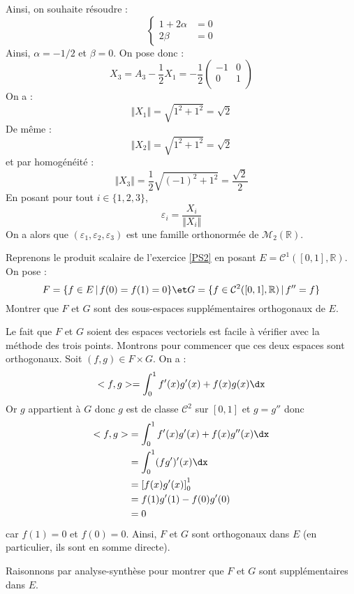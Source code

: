 \documentclass[a4paper,10pt]{report}
\begin{document}
Ainsi, on souhaite résoudre :
$$ \left\lbrace \begin{array}{rl}
1+ 2 \alpha & = 0 \\
2 \beta & = 0 
\end{array}\right.$$
Ainsi, $\alpha=-1/2$ et $\beta=0$.
On pose donc :
$$ X_3 = A_3 - \dfrac{1}{2} X_1 = -\dfrac{1}{2} \begin{pmatrix}
-1 & 0 \\
0 & 1 \\
\end{pmatrix}$$
On a :
$$ \Vert X_1 \Vert = \sqrt{1^2+1^2} = \sqrt{2}$$
De même :
$$ \Vert X_2 \Vert = \sqrt{1^2+1^2} = \sqrt{2}$$
et par homogénéité :
$$ \Vert X_3 \Vert = \dfrac{1}{2} \sqrt{(-1)^2+1^2} = \dfrac{\sqrt{2}}{2}$$
En posant pour tout $i \in \lbrace 1,2,3 \rbrace$,
$$ \varepsilon_i = \dfrac{X_i}{\Vert X_i \Vert}$$
On a alors que $(\varepsilon_1, \varepsilon_2, \varepsilon_3)$ est une famille orthonormée de $\mathcal{M}_2(\mathbb{R})$.

\begin{Exa} Reprenons le produit scalaire de l'exercice \ref{PS2} en posant $E= \mathcal{C}^1([0,1],\mathbb{R})$. On pose :
$$ F = \lbrace f \in E \, \vert \, f(0)=f(1)=0\rbrace \et G= \lbrace f \in \mathcal{C}^2([0,1],\mathbb{R}) \, \vert \, f''=f \rbrace$$
Montrer que $F$ et $G$ sont des sous-espaces supplémentaires orthogonaux  de $E$.
\end{Exa}

\corr Le fait que $F$ et $G$ soient des espaces vectoriels est facile à vérifier avec la méthode des trois points. Montrons pour commencer que ces deux espaces sont orthogonaux. Soit $(f,g) \in F \times G$. On a :
$$<f,g>= \int_{0}^1 f'(x)g'(x)+f(x)g(x) \dx$$
Or $g$ appartient à $G$ donc $g$ est de classe $\mathcal{C}^2$ sur $[0,1]$ et $g=g''$ donc 
\begin{align*}
 <f,g> & = \int_{0}^1 f'(x)g'(x)+f(x)g''(x) \dx \\
 & = \int_{0}^1 (fg')'(x) \dx \\
 &= \left[ f(x)g'(x) \right]_0^1 \\
 & = f(1)g'(1)-f(0)g'(0) \\
 & = 0
 \end{align*}
 car $f(1)=0$ et $f(0)=0$. Ainsi, $F$ et $G$ sont orthogonaux dans $E$ (en particulier, ils sont en somme directe).
 
 \medskip
 
 \noindent Raisonnons par analyse-synthèse pour montrer que $F$ et $G$ sont supplémentaires dans $E$.
 
\end{document}
